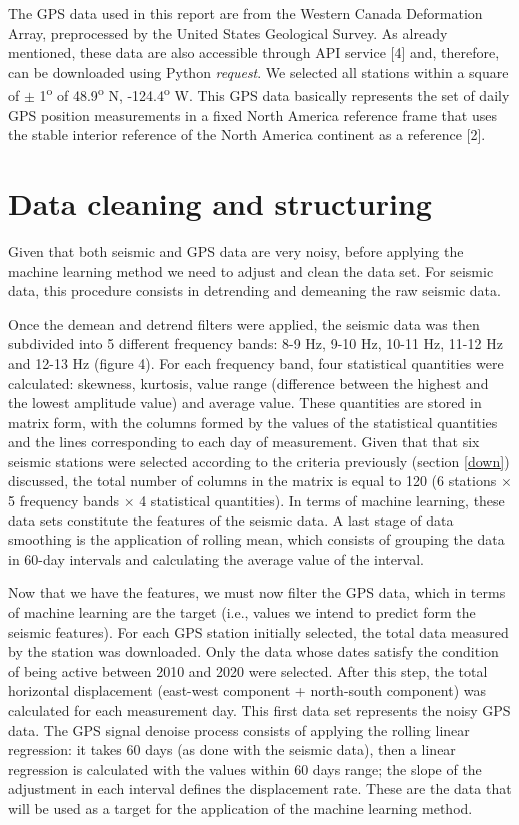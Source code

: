\documentclass{article}
\begin{document}
The GPS data used in this report are from the Western Canada Deformation Array, preprocessed by the United States Geological Survey. As already mentioned, these data are also accessible through API service [4] and, therefore, can be downloaded using Python \textit{request}. We selected all stations within a square of $\pm$ 1\textsuperscript{o} of 48.9\textsuperscript{o} N, -124.4\textsuperscript{o} W. This GPS data basically represents the set of daily GPS position measurements in a fixed North America reference frame that uses the stable interior reference of the North America continent as a reference [2]. 

\section{Data cleaning and structuring}

Given that both seismic and GPS data are very noisy, before applying the machine learning method we need to adjust and clean the data set. For seismic data, this procedure consists in detrending and demeaning the raw seismic data.

Once the demean and detrend filters were applied, the seismic data was then subdivided into 5 different frequency bands: 8-9 Hz, 9-10 Hz, 10-11 Hz, 11-12 Hz and 12-13 Hz (figure 4). For each
frequency band, four statistical quantities were calculated: skewness, kurtosis, value range (difference between the highest and the lowest amplitude value) and average value. These quantities are stored in matrix form, with the columns formed by the values of the statistical quantities and the lines corresponding to each day of measurement. Given that that six seismic stations were selected according to the criteria previously (section \ref{down}) discussed, the total number of columns in the matrix is equal to 120 (6 stations $\times$ 5 frequency bands $\times$ 4 statistical quantities). In terms of machine learning, these data sets constitute the features of the seismic data. A last stage of data smoothing is the application of rolling mean, which consists of grouping the data in 60-day intervals and calculating the average value of the interval.

Now that we have the features, we must now filter the GPS data, which in terms of machine learning are the target (i.e., values we intend to predict form the seismic features). For each GPS station initially selected, the total data measured by the station was downloaded. Only the data whose dates satisfy the condition of being active between 2010 and 2020 were selected. After this step, the total horizontal displacement (east-west component + north-south component) was calculated for each measurement day. This first data set represents the noisy GPS data. The GPS signal denoise process consists of applying the rolling linear regression: it takes 60 days (as done with the seismic data), then a linear regression is calculated with the values within 60 days range; the slope of the adjustment in each interval defines the displacement rate. These are the data that will be used as a target for the application of the machine learning method.
\end{document}
